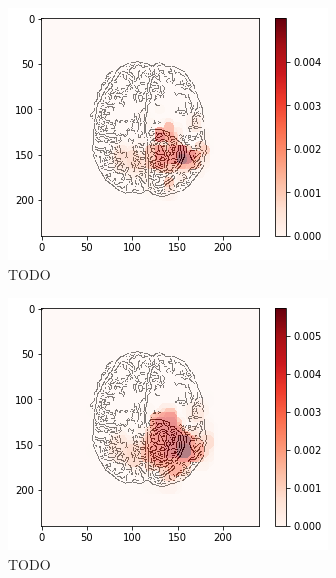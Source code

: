 \begin{figure}[H]
    \centering
    \begin{subfigure}{.33\textwidth}
        \centering
        \includegraphics[width=\linewidth]{chapters/06_hdm/b_Brats18_TCIA08_242_1_L2/28.png}
        \caption{TODO}
    \end{subfigure}%
    \begin{subfigure}{.33\textwidth}
        \centering
        \includegraphics[width=\linewidth]{chapters/06_hdm/circle15/8.png}
        \caption{TODO}
    \end{subfigure}
        \begin{subfigure}{.33\textwidth}

\end{subfigure}
\end{figure}
